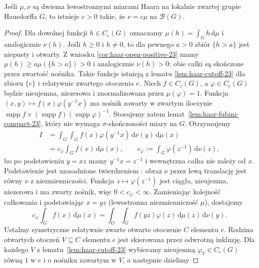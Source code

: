 \begin{twierdzenie}
\label{thm:haar-unique-23}
Jeśli $\mu,\nu$ są dwiema lewostronnymi miarami Haara
na lokalnie zwartej grupie Hausdorffa $G$, to istnieje
$c>0$ takie, że $\nu=c\mu$ na $\mathcal B(G)$.
\end{twierdzenie}
\begin{proof}
Dla dowolnej funkcji $h\in C_c(G)$ oznaczamy
$\mu(h)=\int_G h\,\mathrm d\mu$ i analogicznie $\nu(h)$.
Jeśli $h\ge0$ i $h\ne0$, to dla pewnego $a>0$
zbiór $\{h>a\}$ jest niepusty i otwarty. Z wniosku
\ref{cor:haar-open-positive-23} mamy
$\mu(h)\ge a\mu(\{h>a\})>0$ i analogicznie $\nu(h)>0$;
obie całki są skończone przez zwartość nośnika.
Takie funkcje istnieją z lematu \ref{lem:haar-cutoff-23}
dla zbioru $\{e\}$ i relatywnie zwartego otoczenia $e$.
Niech $f\in C_c(G)$, a $\varphi\in C_c(G)$ będzie
nieujemna, niezerowa i znormalizowana przez
$\mu(\varphi)=1$.
Funkcja $(x,y)\mapsto f(x)\varphi(y^{-1}x)$
ma nośnik zawarty w zwartym iloczynie
$\operatorname{supp}f\times
(\operatorname{supp}f)(\operatorname{supp}\varphi)^{-1}$.
Stosujemy zatem lemat~\ref{lem:haar-fubini-compact-23},
który nie wymaga $\sigma$-skończoności miary na $G$.
Otrzymujemy
\begin{align*}
 I&=\int_G\!\int_G f(x)\varphi(y^{-1}x)
       \,\mathrm d\nu(y)\,\mathrm d\mu(x)\\
  &=c_\varphi\int_Gf(x)\,\mathrm d\mu(x),\qquad
 c_\varphi:=\int_G\varphi(z^{-1})\,\mathrm d\nu(z),
\end{align*}
bo po podstawieniu $y=xz$ mamy
$y^{-1}x=z^{-1}$ i wewnętrzna całka nie zależy
od $x$. Podstawienie jest uzasadnione twierdzeniem
: obraz $\nu$ przez
lewą translację jest równy $\nu$ z niezmienniczości.
Funkcja $z\mapsto\varphi(z^{-1})$ jest ciągła,
nieujemna, niezerowa i ma zwarty nośnik, więc
$0<c_\varphi<\infty$.
Zamieniając kolejność całkowania i podstawiając
$x=yz$ (lewostronna niezmienniczość $\mu$), dostajemy
\begin{equation}\label{eq:haar-uniqueness-23}
 c_\varphi\int_G f(x)\,\mathrm d\mu(x)
 =\int_G\!\int_G f(yz)\varphi(z)
       \,\mathrm d\mu(z)\,\mathrm d\nu(y).
\end{equation}
Ustalmy symetryczne relatywnie zwarte otwarte otoczenie $C$
elementu $e$. Rodzina otwartych otoczeń $V\subseteq C$
elementu $e$ jest skierowana przez odwrotną inkluzję.
Dla każdego $V$ z lematu~\ref{lem:haar-cutoff-23}
wybieramy nieujemną $\varphi_V\in C_c(G)$ równą $1$
w $e$ i o nośniku zawartym w $V$, a następnie dzielimy

\end{proof}
